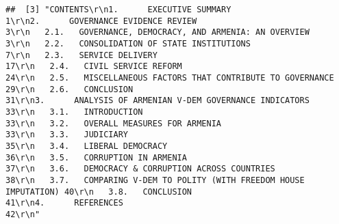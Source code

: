\documentclass[
]{article}
\begin{document}
\begin{verbatim}
##  [3] "CONTENTS\r\n1.      EXECUTIVE SUMMARY                                            1\r\n2.      GOVERNANCE EVIDENCE REVIEW                                   3\r\n   2.1.   GOVERNANCE, DEMOCRACY, AND ARMENIA: AN OVERVIEW            3\r\n   2.2.   CONSOLIDATION OF STATE INSTITUTIONS                        7\r\n   2.3.   SERVICE DELIVERY                                          17\r\n   2.4.   CIVIL SERVICE REFORM                                      24\r\n   2.5.   MISCELLANEOUS FACTORS THAT CONTRIBUTE TO GOVERNANCE       29\r\n   2.6.   CONCLUSION                                                31\r\n3.      ANALYSIS OF ARMENIAN V-DEM GOVERNANCE INDICATORS            33\r\n   3.1.   INTRODUCTION                                              33\r\n   3.2.   OVERALL MEASURES FOR ARMENIA                              33\r\n   3.3.   JUDICIARY                                                 35\r\n   3.4.   LIBERAL DEMOCRACY                                         36\r\n   3.5.   CORRUPTION IN ARMENIA                                     37\r\n   3.6.   DEMOCRACY & CORRUPTION ACROSS COUNTRIES                   38\r\n   3.7.   COMPARING V-DEM TO POLITY (WITH FREEDOM HOUSE IMPUTATION) 40\r\n   3.8.   CONCLUSION                                                41\r\n4.      REFERENCES                                                  42\r\n"                                                                                                                                                                                                                                                                                                                                                                                                                                                                                                                                                                                                                                                                                                                                                                                                                                                                                                                                                                                                                                                                                                                                                                                                                                                                                                                                                                                                                                                                                                                                                                                                                                                                                                                                                                                                                                                                                                                                                                                                                                             
\end{verbatim}
\end{document}
